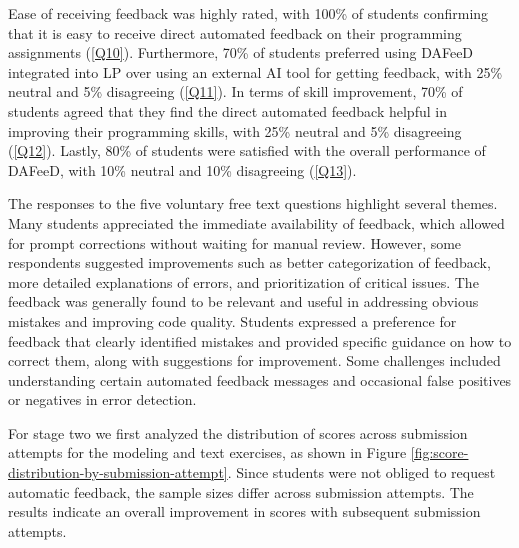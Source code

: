 \documentclass[sigconf,screen,review,anonymous]{acmart}
\begin{document}
Ease of receiving feedback was highly rated, with 100\% of students confirming that it is easy to receive direct automated feedback on their programming assignments (\ref{Q10}).
Furthermore, 70\% of students preferred using DAFeeD integrated into LP over using an external AI tool for getting feedback, with 25\% neutral and 5\% disagreeing (\ref{Q11}).
In terms of skill improvement, 70\% of students agreed that they find the direct automated feedback helpful in improving their programming skills, with 25\% neutral and 5\% disagreeing (\ref{Q12}).
Lastly, 80\% of students were satisfied with the overall performance of DAFeeD, with 10\% neutral and 10\% disagreeing (\ref{Q13}).


The responses to the five voluntary free text questions highlight several themes.
Many students appreciated the immediate availability of feedback, which allowed for prompt corrections without waiting for manual review. 
However, some respondents suggested improvements such as better categorization of feedback, more detailed explanations of errors, and prioritization of critical issues. 
The feedback was generally found to be relevant and useful in addressing obvious mistakes and improving code quality. 
Students expressed a preference for feedback that clearly identified mistakes and provided specific guidance on how to correct them, along with suggestions for improvement. 
Some challenges included understanding certain automated feedback messages and occasional false positives or negatives in error detection.


For stage two we first analyzed the distribution of scores across submission attempts for the modeling and text exercises, as shown in Figure \ref{fig:score-distribution-by-submission-attempt}.
Since students were not obliged to request automatic feedback, the sample sizes differ across submission attempts.
The results indicate an overall improvement in scores with subsequent submission attempts.
\end{document}
